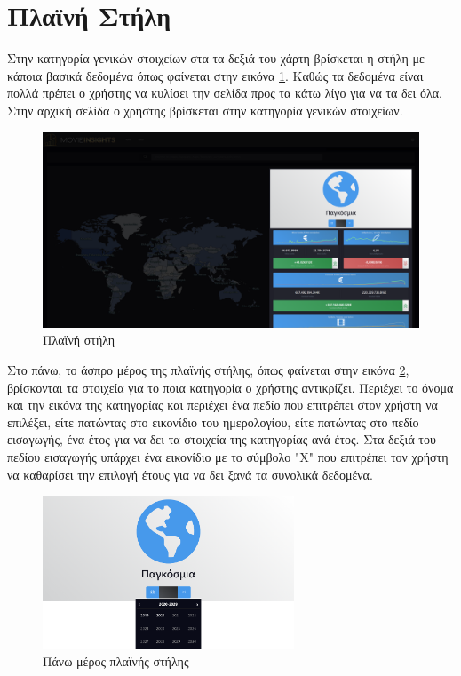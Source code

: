 \section{Πλαϊνή Στήλη}
Στην κατηγορία γενικών στοιχείων στα τα δεξιά του χάρτη βρίσκεται η στήλη με κάποια βασικά δεδομένα όπως φαίνεται στην εικόνα \ref{demo:sidebar}. Καθώς τα δεδομένα είναι πολλά πρέπει ο χρήστης να κυλίσει την σελίδα προς τα κάτω λίγο για να τα δει όλα. Στην αρχική σελίδα ο χρήστης βρίσκεται στην κατηγορία γενικών στοιχείων.

\begin{figure}[h]
  \centering
  \includegraphics[width=145mm]{Chapters/6 - Manual/Images/main_page_sidebar.png}
  \caption{Πλαϊνή στήλη}
  \label{demo:sidebar}
\end{figure}

Στο πάνω, το άσπρο μέρος της πλαϊνής στήλης, όπως φαίνεται στην εικόνα \ref{demo:sidebar_top}, βρίσκονται τα στοιχεία για το ποια κατηγορία ο χρήστης αντικρίζει. Περιέχει το όνομα και την εικόνα της κατηγορίας και περιέχει ένα πεδίο που επιτρέπει στον χρήστη να επιλέξει, είτε πατώντας στο εικονίδιο του ημερολογίου, είτε πατώντας στο πεδίο εισαγωγής, ένα έτος για να δει τα στοιχεία της κατηγορίας ανά έτος. Στα δεξιά του πεδίου εισαγωγής υπάρχει ένα εικονίδιο με το σύμβολο "X" που επιτρέπει τον χρήστη να καθαρίσει την επιλογή έτους για να δει ξανά τα συνολικά δεδομένα.


\begin{figure}[h]
  \centering
  \includegraphics[width=75mm]{Chapters/6 - Manual/Images/main_page_sidebar_top.png}
  \caption{Πάνω μέρος πλαϊνής στήλης}
  \label{demo:sidebar_top}
\end{figure}


